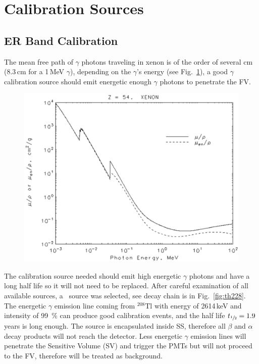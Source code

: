 \section{Calibration Sources}
\label{sec:source}
\subsection{ER Band Calibration}
The mean free path of $\gamma$ photons traveling in xenon is of the order of several cm (8.3\,cm for a 1\,MeV $\gamma$), depending on the $\gamma$'s energy (see Fig.~\ref{fig:MFP}), a good $\gamma$ calibration source should emit energetic enough $\gamma$ photons to penetrate the FV. 

\begin{figure}
	\begin{center}
	\includegraphics[width=\textwidth]{figs/NISTAttXenon.png}%
		\label{fig:MFP}
		\end{center}
	
\end{figure} 

The calibration source needed should emit high energetic $\gamma$ photons and have a long half life so it will not need to be replaced. After careful examination of all available sources, a \Th\ source was selected, see decay chain is in Fig.~\ref{fig:th228}. The energetic $\gamma$ emission line coming from $^{208}\mathrm{Tl}$ with energy of 2614\,keV and intensity of 99~\% can produce good calibration events, and the half life $t_{\sfrac{1}{2}}=1.9$\,years is long enough.
The source is encapsulated inside SS, therefore all $\beta$ and $\alpha$ decay products will not reach the detector. Less energetic $\gamma$ emission lines will penetrate the Sensitive Volume (SV) and trigger the PMTs but will not proceed to the FV, therefore will be treated as background.



